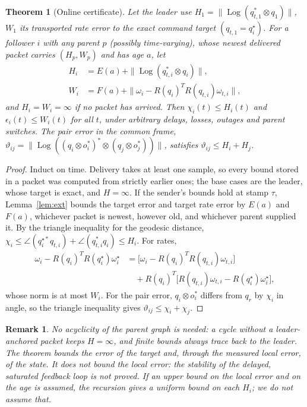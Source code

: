 \documentclass[journal]{IEEEtran}
\DeclareMathOperator{\Log}{Log}
\newtheorem{theorem}{Theorem}
\newtheorem{remark}{Remark}
\begin{document}
\begin{theorem}[Online certificate]\label{thm:cert}
Let the leader use $H_1=\|\Log(q_{t,1}^*\otimes q_1)\|$, $W_1$ its transported rate error to the exact command target $(q_{t,1}=q_i^\star)$. For a follower $i$ with any parent $p$ (possibly time-varying), whose newest delivered packet carries $(H_p,W_p)$ and has age $a$, let
\begin{align}
H_i&=E(a)+\|\Log(q_{t,i}^*\otimes q_i)\|,\\
W_i&=F(a)+\|\omega_i-R(q_i)^TR(q_{t,i})\omega_{t,i}\|,
\end{align}
and $H_i=W_i=\infty$ if no packet has arrived. Then $\chi_i(t)\le H_i(t)$ and $\epsilon_i(t)\le W_i(t)$ for all $t$, under arbitrary delays, losses, outages and parent switches. The pair error in the common frame, $\vartheta_{ij}=\|\Log((q_i\otimes o_i^*)^*\otimes(q_j\otimes o_j^*))\|$, satisfies $\vartheta_{ij}\le H_i+H_j$.
\end{theorem}
\begin{proof}
Induct on time. Delivery takes at least one sample, so every bound stored in a packet was computed from strictly earlier ones; the base cases are the leader, whose target is exact, and $H=\infty$. If the sender's bounds hold at stamp $\tau$, Lemma~\ref{lem:ext} bounds the target error and target rate error by $E(a)$ and $F(a)$, whichever packet is newest, however old, and whichever parent supplied it. By the triangle inequality for the geodesic distance, $\chi_i\le\angle(q_i^{\star*}q_{t,i})+\angle(q_{t,i}^*q_i)\le H_i$. For rates,
\begin{equation}
\begin{aligned}\omega_i-R(q_i)^TR(q_i^\star)\omega_i^\star&=\big[\omega_i-R(q_i)^TR(q_{t,i})\omega_{t,i}\big]\\&\quad+R(q_i)^T\big[R(q_{t,i})\omega_{t,i}-R(q_i^\star)\omega_i^\star\big],\end{aligned}
\end{equation}
whose norm is at most $W_i$. For the pair error, $q_i\otimes o_i^*$ differs from $q_r$ by $\chi_i$ in angle, so the triangle inequality gives $\vartheta_{ij}\le\chi_i+\chi_j$.
\end{proof}

\begin{remark}
No acyclicity of the parent graph is needed: a cycle without a leader-anchored packet keeps $H=\infty$, and finite bounds always trace back to the leader. The theorem bounds the error of the \emph{target} and, through the measured local error, of the state. It does not bound the local error: the stability of the delayed, saturated feedback loop is not proved. If an upper bound on the local error and on the age is assumed, the recursion gives a uniform bound on each $H_i$; we do not assume that.
\end{remark}
\end{document}
